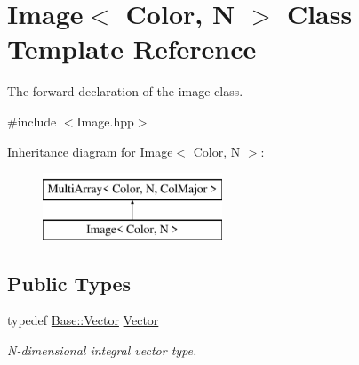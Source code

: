 \hypertarget{class_d_o_1_1_image}{\section{Image$<$ Color, N $>$ Class Template Reference}
\label{class_d_o_1_1_image}
}


The forward declaration of the image class.  




{\ttfamily \#include $<$Image.\-hpp$>$}

Inheritance diagram for Image$<$ Color, N $>$\-:\begin{figure}[H]
\begin{center}
\leavevmode
\includegraphics[height=2.000000cm]{class_d_o_1_1_image}
\end{center}
\end{figure}
\subsection*{Public Types}
\begin{DoxyCompactItemize}
\item 
\hypertarget{class_d_o_1_1_image_abbab566abe3e8de5e0b8b8d3ca150a0c}{typedef \hyperlink{class_d_o_1_1_multi_array_a566f0c85cbe372baeec72065fc245842}{Base\-::\-Vector} \hyperlink{class_d_o_1_1_image_abbab566abe3e8de5e0b8b8d3ca150a0c}{Vector}}\label{class_d_o_1_1_image_abbab566abe3e8de5e0b8b8d3ca150a0c}

\begin{DoxyCompactList}\small\item\em N-\/dimensional integral vector type. \end{DoxyCompactList}\end{DoxyCompactItemize}
